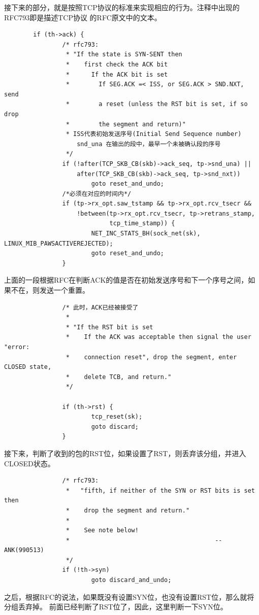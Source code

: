 		接下来的部分，就是按照TCP协议的标准来实现相应的行为。注释中出现的RFC793即是描述TCP协议
		的RFC原文中的文本。
\begin{verbatim}
        if (th->ack) {
                /* rfc793:
                 * "If the state is SYN-SENT then
                 *    first check the ACK bit
                 *      If the ACK bit is set
                 *        If SEG.ACK =< ISS, or SEG.ACK > SND.NXT, send
                 *        a reset (unless the RST bit is set, if so drop
                 *        the segment and return)"
                 * ISS代表初始发送序号(Initial Send Sequence number)
                    snd_una 在输出的段中，最早一个未被确认段的序号
                 */
                if (!after(TCP_SKB_CB(skb)->ack_seq, tp->snd_una) ||
                    after(TCP_SKB_CB(skb)->ack_seq, tp->snd_nxt))
                        goto reset_and_undo;
				/*必须在对应的时间内*/
                if (tp->rx_opt.saw_tstamp && tp->rx_opt.rcv_tsecr &&
                    !between(tp->rx_opt.rcv_tsecr, tp->retrans_stamp,
                             tcp_time_stamp)) {
                        NET_INC_STATS_BH(sock_net(sk), LINUX_MIB_PAWSACTIVEREJECTED);
                        goto reset_and_undo;
                }
\end{verbatim}
上面的一段根据RFC在判断ACK的值是否在初始发送序号和下一个序号之间，如果不在，则发送一个重置。
\begin{verbatim}
                /* 此时，ACK已经被接受了
                 *
                 * "If the RST bit is set
                 *    If the ACK was acceptable then signal the user "error:
                 *    connection reset", drop the segment, enter CLOSED state,
                 *    delete TCB, and return."
                 */

                if (th->rst) {
                        tcp_reset(sk);
                        goto discard;
                }
\end{verbatim}
接下来，判断了收到的包的RST位，如果设置了RST，则丢弃该分组，并进入CLOSED状态。
\begin{verbatim}
                /* rfc793:
                 *   "fifth, if neither of the SYN or RST bits is set then
                 *    drop the segment and return."
                 *
                 *    See note below!
                 *                                        --ANK(990513)
                 */
                if (!th->syn)
                        goto discard_and_undo;
\end{verbatim}
之后，根据RFC的说法，如果既没有设置SYN位，也没有设置RST位，那么就将分组丢弃掉。
前面已经判断了RST位了，因此，这里判断一下SYN位。

